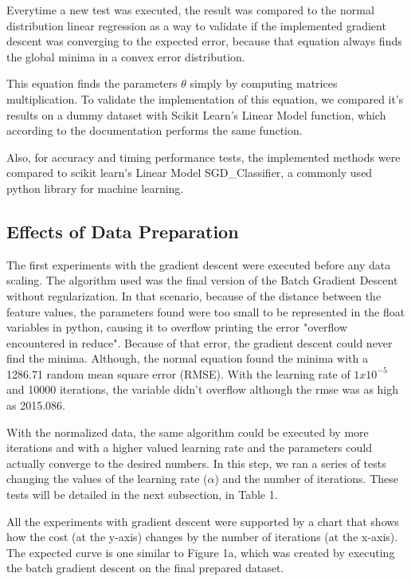 \documentclass[conference]{IEEEtran}
\begin{document}
	Everytime a new test was executed, the result was compared to the normal distribution linear regression as a way to validate if the implemented gradient descent was converging to the expected error, because that equation always finds the global minima in a convex error distribution. 
	
	This equation finds the parameters $\theta$ simply by computing matrices multiplication. To validate the implementation of this equation, we compared it's results on a dummy dataset with Scikit Learn's Linear Model function, which according to the documentation performs the same function.
	
	Also, for accuracy and timing performance tests, the implemented methods were compared to scikit learn's Linear Model SGD\_Classifier, a commonly used python library for machine learning.
	
\subsection{Effects of Data Preparation}
	
    The first experiments with the gradient descent were executed before any data scaling. The algorithm used was the final version of the Batch Gradient Descent without regularization. In that scenario, because of the distance between the feature values, the parameters found were too small to be represented in the float variables in python, causing it to overflow printing the error "overflow encountered in reduce". Because of that error, the gradient descent could never find the minima. Although, the normal equation found the minima with a 1286.71 random mean square error (RMSE). With the learning rate of $1x10^{-5}$ and 10000 iterations, the variable didn't overflow although the rmse was as high as 2015.086.
    
    With the normalized data, the same algorithm could be executed by more iterations and with a higher valued learning rate and the parameters could actually converge to the desired numbers. In this step, we ran a series of tests changing the values of the learning rate ($\alpha$) and the number of iterations. These tests will be detailed in the next subsection, in Table 1.
    
    All the experiments with gradient descent were supported by a chart that shows how the cost (at the y-axis) changes by the number of iterations (at the x-axis). The expected curve is one similar to Figure 1a, which was created by executing the batch gradient descent on the final prepared dataset. 
    
\end{document}
